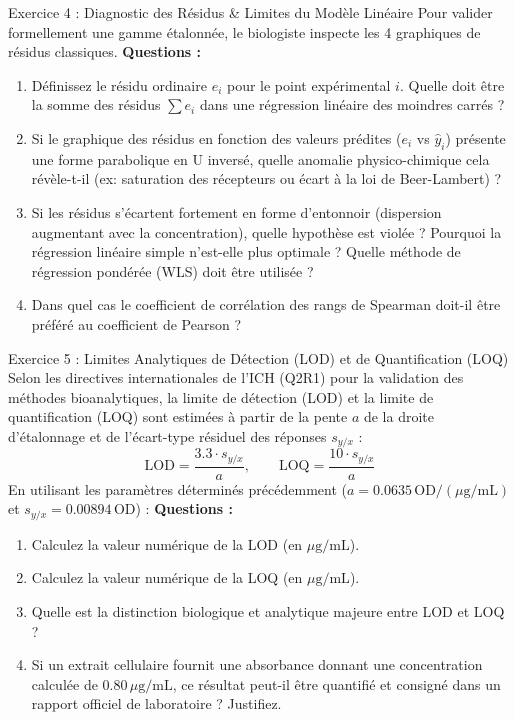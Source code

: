 \documentclass[11pt,a4paper]{article}
\begin{document}
\begin{exercicebox}{Exercice 4 : Diagnostic des Résidus \& Limites du Modèle Linéaire}
Pour valider formellement une gamme étalonnée, le biologiste inspecte les 4 graphiques de résidus classiques.
\textbf{Questions :}
\begin{enumerate}[label=\textbf{\alph*.}]
  \item Définissez le résidu ordinaire $e_i$ pour le point expérimental $i$. Quelle doit être la somme des résidus $\sum e_i$ dans une régression linéaire des moindres carrés ?
  \item Si le graphique des résidus en fonction des valeurs prédites ($e_i$ vs $\hat{y}_i$) présente une forme parabolique en U inversé, quelle anomalie physico-chimique cela révèle-t-il (ex: saturation des récepteurs ou écart à la loi de Beer-Lambert) ?
  \item Si les résidus s'écartent fortement en forme d'entonnoir (dispersion augmentant avec la concentration), quelle hypothèse est violée ? Pourquoi la régression linéaire simple n'est-elle plus optimale ? Quelle méthode de régression pondérée (WLS) doit être utilisée ?
  \item Dans quel cas le coefficient de corrélation des rangs de Spearman doit-il être préféré au coefficient de Pearson ?
\end{enumerate}
\end{exercicebox}

\begin{exercicebox}{Exercice 5 : Limites Analytiques de Détection (LOD) et de Quantification (LOQ)}
Selon les directives internationales de l'ICH (Q2R1) pour la validation des méthodes bioanalytiques, la limite de détection (LOD) et la limite de quantification (LOQ) sont estimées à partir de la pente $a$ de la droite d'étalonnage et de l'écart-type résiduel des réponses $s_{y/x}$ :
\begin{equation*}
  \text{LOD} = \frac{3.3 \cdot s_{y/x}}{a}, \qquad \text{LOQ} = \frac{10 \cdot s_{y/x}}{a}
\end{equation*}
En utilisant les paramètres déterminés précédemment ($a = 0.0635\,\text{OD}/(\mu\text{g/mL})$ et $s_{y/x} = 0.00894\,\text{OD}$) :
\textbf{Questions :}
\begin{enumerate}[label=\textbf{\alph*.}]
  \item Calculez la valeur numérique de la LOD (en $\mu\text{g/mL}$).
  \item Calculez la valeur numérique de la LOQ (en $\mu\text{g/mL}$).
  \item Quelle est la distinction biologique et analytique majeure entre LOD et LOQ ?
  \item Si un extrait cellulaire fournit une absorbance donnant une concentration calculée de $0.80\,\mu\text{g/mL}$, ce résultat peut-il être quantifié et consigné dans un rapport officiel de laboratoire ? Justifiez.
\end{enumerate}
\end{exercicebox}
\end{document}
